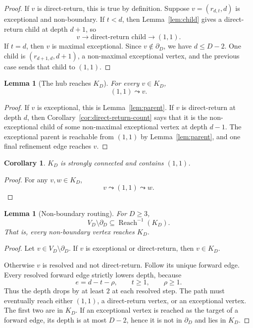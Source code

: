 \documentclass[11pt]{article}
\newtheorem{lemma}[theorem]{Lemma}
\newtheorem{corollary}[theorem]{Corollary}
\theoremstyle{definition}
\theoremstyle{remark}
\newcommand{\bdD}{\partial_D}
\newcommand{\Reach}{\operatorname{Reach}}
\begin{document}
\begin{proof}
If $v$ is direct-return, this is true by definition.  Suppose $v=(r_{d,t},d)$ is exceptional and non-boundary.  If $t<d$, then Lemma~\ref{lem:child} gives a direct-return child at depth $d+1$, so
\[
v\to\text{direct-return child}\to(1,1).
\]
If $t=d$, then $v$ is maximal exceptional.  Since $v\notin\bdD$, we have $d\le D-2$.  One child is $(r_{d+1,d},d+1)$, a non-maximal exceptional vertex, and the previous case sends that child to $(1,1)$.
\end{proof}

\begin{lemma}[The hub reaches $K_D$]\label{lem:hub-reaches-k}
For every $v\in K_D$,
\[
(1,1)\leadsto v.
\]
\end{lemma}

\begin{proof}
If $v$ is exceptional, this is Lemma~\ref{lem:parent}.  If $v$ is direct-return at depth $d$, then Corollary~\ref{cor:direct-return-count} says that it is the non-exceptional child of some non-maximal exceptional vertex at depth $d-1$.  The exceptional parent is reachable from $(1,1)$ by Lemma~\ref{lem:parent}, and one final refinement edge reaches $v$.
\end{proof}

\begin{corollary}\label{cor:k-strong}
$K_D$ is strongly connected and contains $(1,1)$.
\end{corollary}

\begin{proof}
For any $v,w\in K_D$,
\[
v\leadsto(1,1)\leadsto w.
\]
\end{proof}

\begin{lemma}[Non-boundary routing]\label{lem:non-boundary-routing}
For $D\ge3$,
\[
V_D\setminus\bdD\subseteq\Reach^{-1}(K_D).
\]
That is, every non-boundary vertex reaches $K_D$.
\end{lemma}

\begin{proof}
Let $v\in V_D\setminus\bdD$.  If $v$ is exceptional or direct-return, then $v\in K_D$.

Otherwise $v$ is resolved and not direct-return.  Follow its unique forward edge.  Every resolved forward edge strictly lowers depth, because
\[
e=d-t-\rho,
\qquad t\ge1,
\qquad \rho\ge1.
\]
Thus the depth drops by at least $2$ at each resolved step.  The path must eventually reach either $(1,1)$, a direct-return vertex, or an exceptional vertex.  The first two are in $K_D$.  If an exceptional vertex is reached as the target of a forward edge, its depth is at most $D-2$, hence it is not in $\bdD$ and lies in $K_D$.
\end{proof}
\end{document}
